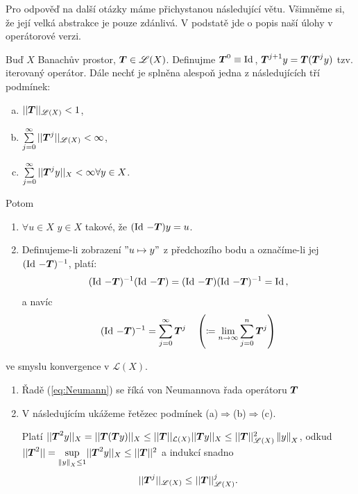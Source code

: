 Pro odpověď na další otázky máme přichystanou následující větu. Všimněme si, že její velká abstrakce je pouze zdánlivá. V podstatě jde o popis naší úlohy v operátorové verzi.


\begin{theorem}
\label{theorem:str14}
Buď $X$ Banachův prostor, $ \boldsymbol{T} \in\mathscr{L}(X)$. Definujme $ \boldsymbol{T} ^0\equiv \operatorname{Id}\,$, $ \boldsymbol{T} ^{j+1}y= \boldsymbol{T} ( \boldsymbol{T} ^jy)$ tzv. iterovaný operátor. Dále nechť je splněna alespoň jedna z následujících tří podmínek:
\begin{enumerate}[(a)]
    \item $|| \boldsymbol{T} ||_{\mathscr{L}(X)}<1$,
    \item $\sum\limits_{j=0}^\infty|| \boldsymbol{T} ^j||_{\mathscr{L}(X)}<\infty$,
    \item $\sum\limits_{j=0}^\infty|| \boldsymbol{T} ^jy||_X<\infty \forall y\in X$.
\end{enumerate}
Potom
\begin{enumerate}
    \item $\forall u \in X$  $y\in X$ takové, že $(\operatorname{Id}\,- \boldsymbol{T} )y=u$.
    \item Definujeme-li zobrazení $"u\mapsto y"$ z předchozího bodu a označíme-li jej $(\operatorname{Id}\,- \boldsymbol{T} )^{-1}$, platí:
    \begin{equation}
        (\operatorname{Id}\,- \boldsymbol{T} )^{-1}(\operatorname{Id}\,- \boldsymbol{T} ) = (\operatorname{Id}\,- \boldsymbol{T} )(\operatorname{Id}\,- \boldsymbol{T} )^{-1}=\operatorname{Id}\,,
    \end{equation}
    a navíc
    \begin{equation}
        (\operatorname{Id}\,- \boldsymbol{T} )^{-1}=\sum\limits_{j=0}^\infty  \boldsymbol{T} ^j \quad \left(\coloneqq \underset{n\rightarrow\infty}{\lim} \sum\limits_{j=0}^{n}  \boldsymbol{T} ^j\right)
        \label{eq:Neumann}
    \end{equation}
\end{enumerate}
ve smyslu konvergence v $\mathscr{L}(X)$.
\end{theorem} 

\Poznamka

\begin{enumerate}
    \item Řadě (\ref{eq:Neumann}) se říká von Neumannova řada operátoru $ \boldsymbol{T} $
    \item V následujícím ukážeme řetězec podmínek (a)$\Rightarrow$(b)$\Rightarrow$(c).
    
    Platí $|| \boldsymbol{T} ^2y||_X = || \boldsymbol{T} ( \boldsymbol{T} y)||_X\leq|| \boldsymbol{T} ||_{\mathcal{L}(X)}|| \boldsymbol{T} y||_X\leq|| \boldsymbol{T} ||^2_{\mathscr{L}(X)}\left\lVert y\right\rVert_X$, odkud $|| \boldsymbol{T} ^2||=\underset{\left\lVert y\right\rVert_X\leq 1}{\sup}|| \boldsymbol{T} ^2y||_X\leq|| \boldsymbol{T} ||^2$ a indukcí snadno
    \begin{equation}
        || \boldsymbol{T} ^j||_{\mathscr{L}(X)}\leq || \boldsymbol{T} ||^j_{\mathscr{L}(X)}.
    \end{equation}
\end{enumerate}

